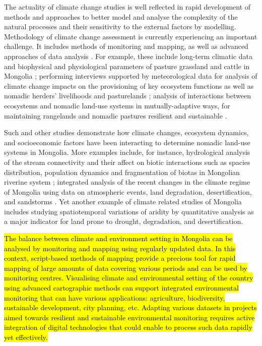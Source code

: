 \documentclass[geosciences,article,submit,pdftex,moreauthors]{Definitions/mdpi}
\begin{document}
The actuality of climate change studies is well reflected in rapid development of methods and approaches to better model and analyse the complexity of the natural processes and their sensitivity to the external factors by modelling. Methodology of climate change assessment is currently experiencing an important challenge. It includes methods of monitoring and mapping, as well as advanced approaches of data analysis \cite{FENG2020102861,WANG201768,GUO2021141481}. For example, these include long-term  climatic data and biophysical and physiological parameters of pasture grassland and cattle in Mongolia \cite{Bolortsetseg,SASAKI2022104690}; performing interviews supported by meteorological data for analysis of climate change impacts on the provisioning of key ecosystem functions as well as nomadic herders' livelihoods and pasturelands \cite{Tugjamba}; analysis of interactions between ecosystems and nomadic land-use systems in mutually-adaptive ways, for maintaining rangelands and nomadic pastures resilient and sustainable \cite{Chuluun}. 

Such and other studies demonstrate how climate changes, ecosystem dynamics, and socioeconomic factors have been interacting to determine nomadic land-use systems in Mongolia. More examples include, for instance, hydrological analysis of the stream connectivity and their affect on biotic interactions such as spacies distribution, population dynamics and fragmentation of biotas in Mongolian riverine system \cite{Maasri}; integrated analysis of the recent changes in the climate regime of Mongolia using data on atmospheric events, land degradation, desertification, and sandstorms \cite{Hanetal}. Yet another example of climate related studies of Mongolia \cite{Nyamtseren} includes studying spatiotemporal variations of aridity by quantitative analysis as a major indicator for land prone to drought, degradation, and desertification.

\hl{The balance between climate and environment setting in Mongolia can be analysed by monitoring and mapping using regularly updated data. In this context, script-based methods of mapping provide a precious tool for rapid mapping of large amounts of data covering various periods and can be used by monitoring centres. Visualising climate and environmental setting of the country using advanced cartographic methods can support integrated environmental monitoring that can have various applications: agriculture, biodiversity, sustainable development, city planning, etc. Adapting various datasets in projects aimed towards resilient and sustainable environmental monitoring requires active integration of digital technologies that could enable to process such data rapidly yet effectively.}
\end{document}

